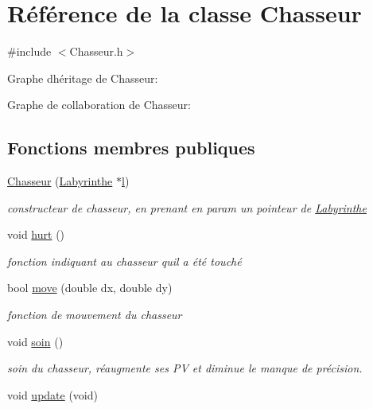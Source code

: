 \hypertarget{classChasseur}{}\section{Référence de la classe Chasseur}
\label{classChasseur}


{\ttfamily \#include $<$Chasseur.\+h$>$}



Graphe d\textquotesingle{}héritage de Chasseur\+:


Graphe de collaboration de Chasseur\+:
\subsection*{Fonctions membres publiques}
\begin{DoxyCompactItemize}
\item 
\hyperlink{classChasseur_a1901991ecabfb707b82334f56b277560}{Chasseur} (\hyperlink{classLabyrinthe}{Labyrinthe} $\ast$\hyperlink{classChasseur_a96372f6800e28733746f01393aa47ff6}{l})
\begin{DoxyCompactList}\small\item\em constructeur de chasseur, en prenant en param un pointeur de \hyperlink{classLabyrinthe}{Labyrinthe} \end{DoxyCompactList}\item 
void \hyperlink{classChasseur_ac75a09254dea5b1d25c7dbf49809a273}{hurt} ()
\begin{DoxyCompactList}\small\item\em fonction indiquant au chasseur qu\textquotesingle{}il a été touché \end{DoxyCompactList}\item 
bool \hyperlink{classChasseur_ac5275e34388084bc3ca2114b45a0b725}{move} (double dx, double dy)
\begin{DoxyCompactList}\small\item\em fonction de mouvement du chasseur \end{DoxyCompactList}\item 
void \hyperlink{classChasseur_a12f5813aa74534ad928c788ddbcd2c31}{soin} ()
\begin{DoxyCompactList}\small\item\em soin du chasseur, réaugmente ses PV et diminue le manque de précision. \end{DoxyCompactList}\item 
void \hyperlink{classChasseur_a6ea64de0a2708b21326dcb980f0e06ac}{update} (void)
\item 

\end{DoxyCompactItemize}
